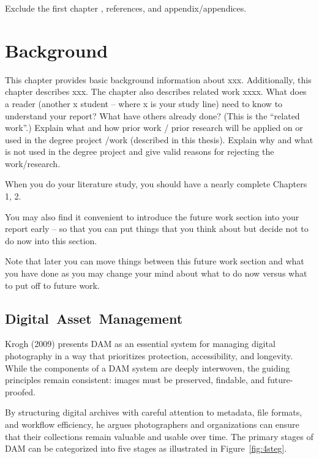 \documentclass[a4paper,12pt,twocolumn]{article}
\numberwithin{figure}{section}
\numberwithin{table}{section}
\begin{document}
Exclude the first chapter , references, and appendix/appendices. 


\section{Background}
This chapter provides basic background information about xxx. Additionally, this chapter describes
xxx. The chapter also describes related work xxxx.
What does a reader (another x student -- where x is your study line) need to know to understand
your report?
What have others already done? (This is the “related work”.) Explain what and how prior work /
prior research will be applied on or used in the degree project /work (described in this thesis).
Explain why and what is not used in the degree project and give valid reasons for rejecting the
work/research.

When you do your literature study, you should have a nearly complete Chapters 1, 2.

You may also find it convenient to introduce the future work section into your report early – so that you can put things that you think about but decide not to do now into this section.

Note that later you can move things between this future work section and what you have done as you may change your mind about what to do now versus what to put off to future work.

\subsection{\mbox{Digital Asset Management}}
Krogh (2009) presents DAM as an essential system for managing digital photography in a way that prioritizes protection, 
accessibility, and longevity. While the components of a DAM system are deeply interwoven, the guiding principles 
remain consistent: images must be preserved, findable, and future-proofed\citep{krogh2009}. 
\vspace{0.3cm}

By structuring digital archives with careful attention to metadata, file formats, and workflow efficiency, he argues photographers and organizations can ensure 
that their collections remain valuable and usable over time. The primary stages of DAM can be 
categorized into five stages as illustrated in Figure~\ref{fig:4steg}.
\end{document}
